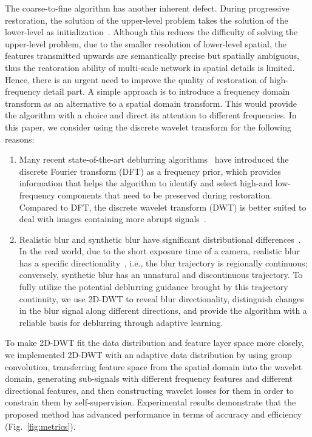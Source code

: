 \documentclass[10pt,twocolumn,letterpaper]{article}
\begin{document}
The coarse-to-fine algorithm has another inherent defect. During progressive restoration, the solution of the upper-level problem takes the solution of the lower-level as initialization~\cite{kim2022mssnet}. Although this reduces the difficulty of solving the upper-level problem, due to the smaller resolution of lower-level spatial, the features transmitted upwards are semantically precise but spatially ambiguous, thus the reatoration ability of multi-scale network in spatial details is limited. Hence, there is an urgent need to improve the quality of restoration of high-frequency detail part. A simple approach is to introduce a frequency domain transform as an alternative to a spatial domain transform. This would provide the algorithm with a choice and direct its attention to different frequencies. 
In this paper, we consider using the discrete wavelet transform for the following reasons:
\begin{enumerate}
    \item Many recent state-of-the-art deblurring algorithms~\cite{mao2021deep,kong2023efficient,zou2021sdwnet} have introduced the discrete Fourier transform (DFT) as a frequency prior, which provides information that helps the algorithm to identify and select high-and low-frequency components that need to be preserved during restoration. Compared to DFT, the discrete wavelet transform (DWT) is better suited to deal with images containing more abrupt signals~\cite{daubechies1990wavelet}.
    \item Realistic blur and synthetic blur have significant distributional differences~\cite{rim2022realistic}. In the real world, due to the short exposure time of a camera, realistic blur has a specific directionality~\cite{tsai2022banet}, i.e., the blur trajectory is regionally continuous; conversely, synthetic blur has an unnatural and discontinuous trajectory. To fully utilize the potential deblurring guidance brought by this trajectory continuity, we use 2D-DWT to reveal blur directionality, distinguish changes in the blur signal along different directions, and provide the algorithm with a reliable basis for deblurring through adaptive learning.
\end{enumerate}

To make 2D-DWT fit the data distribution and feature layer space more closely, we implemented 2D-DWT with an adaptive data distribution by using group convolution, transferring feature space from the spatial domain into the wavelet domain, generating sub-signals with different frequency features and different directional features, and then constructing wavelet losses for them in order to constrain them by self-supervision. Experimental results demonstrate that the proposed method has advanced performance in terms of accuracy and efficiency (Fig.~\ref{fig:metrics}).
\end{document}
